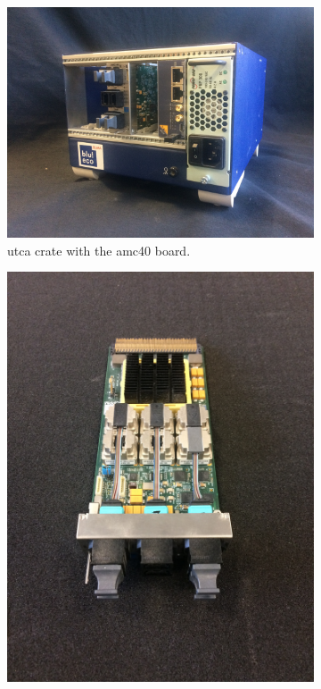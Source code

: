 \begin{figure}
\begin{subfigure}[htbp]{.55\textwidth}
\centering
\includegraphics[width=\linewidth]{03_GraphicFiles/chapter3_CLaRySproto/Electronics_Acquisition/uTCAcrate_1.jpg}
\caption{\gls{utca} crate with the \gls{amc}40 board.}
\label{chap3::fig::uTCAcrate}
\end{subfigure}
\begin{subfigure}[htbp]{.41\textwidth}
\centering
\includegraphics[width=\linewidth, angle = -90]{03_GraphicFiles/chapter3_CLaRySproto/Electronics_Acquisition/AMC40_ipnl_top.jpg}

\end{subfigure}
\end{figure}
